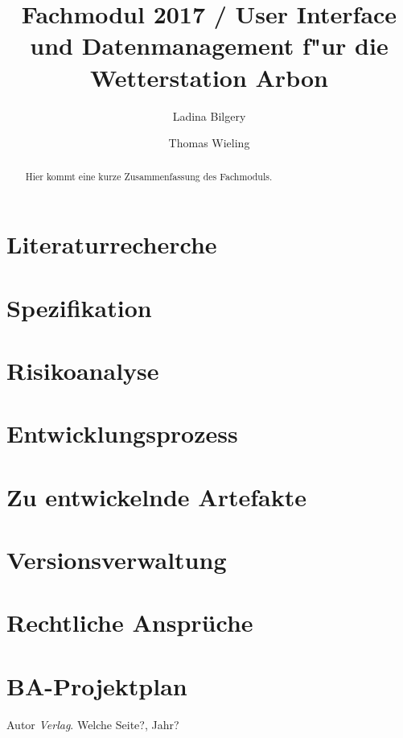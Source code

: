 \documentclass[12pt]{report}
\begin{document}
\title{Fachmodul 2017 / User Interface und Datenmanagement f"ur die Wetterstation Arbon}
\author{Ladina Bilgery \and Thomas Wieling}
\maketitle
\tableofcontents
\begin{abstract}
Hier kommt eine kurze Zusammenfassung des Fachmoduls.
\end{abstract}
\chapter{Literaturrecherche}
\chapter{Spezifikation}
\chapter{Risikoanalyse}
\chapter{Entwicklungsprozess}
\chapter{Zu entwickelnde Artefakte}
\chapter{Versionsverwaltung}
\chapter{Rechtliche Ansprüche}
\chapter{BA-Projektplan}


\begin{thebibliography}{9}
Autor
\textit{Verlag}. 
Welche Seite?, Jahr?
\end{thebibliography}
\end{document}
